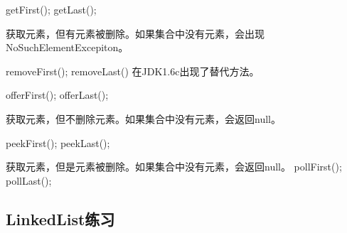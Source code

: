 \documentclass[UTF8]{ctexart}
\begin{document}
getFirst();
getLast();

获取元素，但有元素被删除。如果集合中没有元素，会出现NoSuchElementExcepiton。

removeFirst();
removeLast()
在JDK1.6c出现了替代方法。

offerFirst();
offerLast();

获取元素，但不删除元素。如果集合中没有元素，会返回null。

peekFirst();
peekLast();

获取元素，但是元素被删除。如果集合中没有元素，会返回null。
pollFirst();
pollLast();



\subsection{LinkedList练习}


\end{document}
